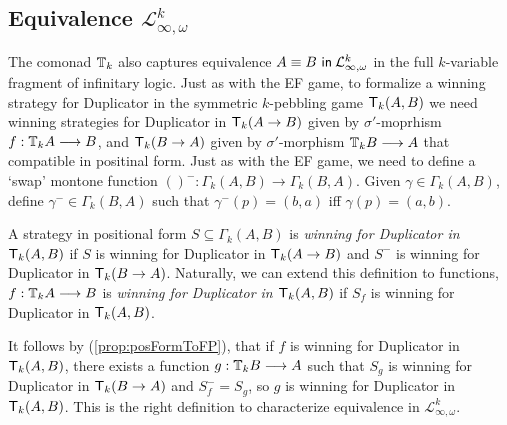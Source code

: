 \subsection{Equivalence $\mathcal{L}^{k}_{\infty,\omega}$}
The comonad ${\mathbb{T}_{k}}$ also captures equivalence ${A \equiv B \ \mathsf{in}\: \mathcal{L}^{k}_{\infty,\omega}}$ in the full $k$-variable fragment of infinitary logic. Just as with the EF game, to formalize a winning strategy for Duplicator in the symmetric $k$-pebbling game ${\mathsf{T}_{k}(A,B)}$ we need winning strategies for Duplicator in ${\mathsf{T}_{k}(A \rightarrow B)}$ given by $\sigma'$-moprhism $f:{\mathbb{T}_{k}A} \longrightarrow B$, and ${\mathsf{T}_{k}(B \rightarrow A)}$ given by $\sigma'$-morphism ${\mathbb{T}_{k}B} \longrightarrow A$ that compatible in positinal form. Just as with the EF game, we need to define a `swap' montone function $()^{-}:\Gamma_{k}(A,B) \longrightarrow \Gamma_{k}(B,A)$. Given $\gamma \in \Gamma_{k}(A,B)$, define $\gamma^{-} \in \Gamma_{k}(B,A)$ such that $\gamma^{-}(p) = (b,a)$ iff $\gamma(p) = (a,b)$. 
\begin{defn}
A strategy in positional form $S \subseteq \Gamma_{k}(A,B)$ is \textit{winning for Duplicator in ${\mathsf{T}_{k}(A,B)}$} if $S$ is winning for Duplicator in ${\mathsf{T}_{k}(A \rightarrow B)}$ and $S^{-}$ is winning for Duplicator in ${\mathsf{T}_{k}(B \rightarrow A)}$. Naturally, we can extend this definition to functions, $f:{\mathbb{T}_{k}A} \longrightarrow B$ is \textit{winning for Duplicator in ${\mathsf{T}_{k}(A,B)}$} if $S_{f}$ is winning for Duplicator in ${\mathsf{T}_{k}(A,B)}$.
\end{defn}
It follows by (\ref{prop:posFormToFP}), that if $f$ is winning for Duplicator in ${\mathsf{T}_{k}(A,B)}$, there exists a function $g:{\mathbb{T}_{k}B} \longrightarrow A$ such that $S_{g}$ is winning for Duplicator in ${\mathsf{T}_{k}(B \rightarrow A)}$ and $S_{f}^{-} = S_{g}$, so $g$ is winning for Duplicator in ${\mathsf{T}_{k}(A,B)}$. This is the right definition to characterize equivalence in $\mathcal{L}^{k}_{\infty,\omega}$. 
